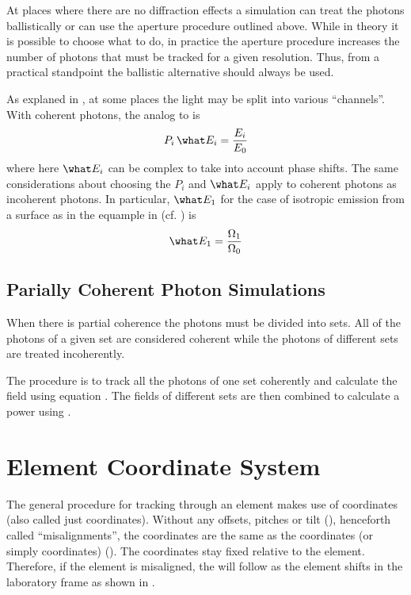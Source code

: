 At places where there are no diffraction effects a simulation can
treat the photons ballistically or can use the aperture procedure
outlined above. While in theory it is possible to choose what to do, in
practice the aperture procedure increases the number of photons that
must be tracked for a given resolution. Thus, from a practical standpoint
the ballistic alternative should always be used.

As explaned in , at some places the light may be split
into various ``channels''. With coherent photons, the analog to  is
\begin{equation}
  P_i \, \what E_i = \frac{E_i}{E_0}
  \label{rpss2}
\end{equation}
where here $\what E_i$ can be complex to take into account phase shifts.
The same considerations about choosing the $P_i$ and $\what E_i$ apply to
coherent photons as incoherent photons. In particular, $\what E_1$ for the
case of isotropic emission from a surface as in the equample in
 (cf. ) is
\begin{equation}
  \what E_1 = \frac{\Omega_1}{\Omega_0}
\end{equation}

\subsection{Parially Coherent Photon Simulations}

When there is partial coherence the photons must be divided into
sets. All of the photons of a given set are considered coherent while
the photons of different sets are treated incoherently.

The procedure is to track all the photons of one set coherently and
calculate the field using equation . The fields of
different sets are then combined to calculate a power using
.

\section{Element Coordinate System}
\label{s:photon.ele.coords}

The general procedure for tracking through an element makes use of
 coordinates (also called just 
coordinates). Without any offsets, pitches or tilt (), henceforth
called ``misalignments'', the  coordinates are the same
as the  coordinates (or simply 
coordinates) (). The  coordinates stay fixed
relative to the element. Therefore, if the element is misaligned, the
 will follow as the element shifts in the
laboratory frame as shown in .

